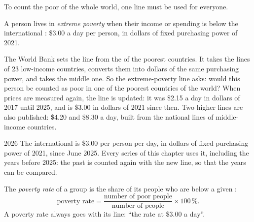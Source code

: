 To count the poor of the whole world, one line must be used for everyone.

\begin{definition}\label{def:g6:poverty:extreme-poverty}
A person lives in \emph{extreme poverty} when their
income or spending is below the international : \$3.00 a day per
person, in dollars of fixed purchasing power of 2021.
\end{definition}

\begin{measure}[The extreme-poverty line]
The World Bank sets the line from the  of the poorest
countries. It takes the lines of 23 low-income countries, converts them into
dollars of the same purchasing power, and takes the middle one. So the
extreme-poverty line asks: would this person be counted as poor in one of the
poorest countries of the world? When prices are measured again, the line is
updated: it was \$2.15 a day in dollars of 2017 until 2025, and is \$3.00 in
dollars of 2021 since then. Two higher lines are also published: \$4.20 and
\$8.30 a day, built from the national lines of middle-income countries.
\end{measure}

\begin{dated}{2026}
The international  is \$3.00 per person per day, in dollars of
fixed purchasing power of 2021, since June 2025. Every series of this chapter
uses it, including the years before 2025: the past is counted again with the
new line, so that the years can be compared.
\end{dated}

\begin{definition}\label{def:g6:poverty:poverty-rate}
The \emph{poverty rate} of a group is the share of its
people who are below a given :
\[
  \text{poverty rate} = \frac{\text{number of poor people}}{\text{number of people}}
  \times 100\,\%.
\]
A poverty rate always goes with its line: ``the rate at \$3.00 a day''.
\end{definition}

